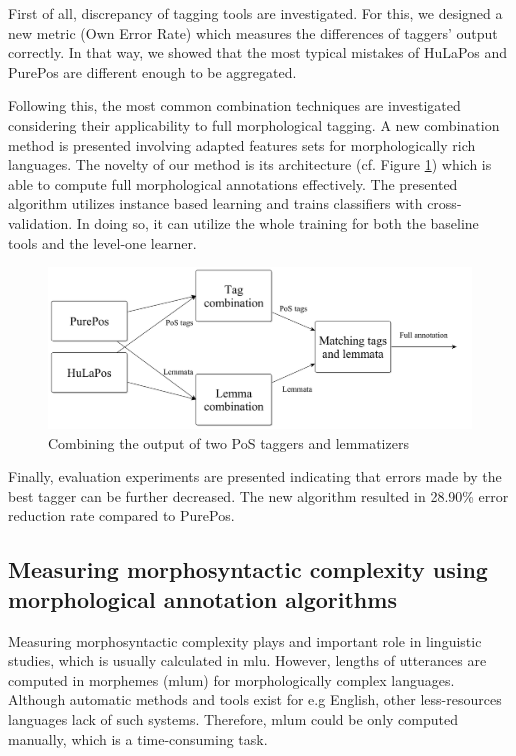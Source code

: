 First of all, discrepancy of tagging tools are investigated. 
For this, we designed a new metric (Own Error Rate) which measures the differences of taggers' output correctly.
In that way, we showed that the most typical mistakes of HuLaPos and PurePos are different enough to be aggregated.

Following this, the most common combination techniques are investigated considering their applicability to full morphological tagging.
A new combination method is presented involving adapted features sets for morphologically rich languages.
The novelty of our method is its architecture (cf. Figure \ref{fig:comb3_en}) which is able to compute full morphological annotations effectively.
The presented algorithm utilizes instance based learning \cite{Aha1991} and trains classifiers with cross-validation.
In doing so, it can utilize the whole training for both the baseline tools and the level-one learner.

\begin{figure}[H]
  \centering
  \includegraphics[scale=0.15]{MorphTagging/comb3.png} 
  \caption{Combining the output of two PoS taggers and lemmatizers}
  \label{fig:comb3_en}
\end{figure}


Finally, evaluation experiments are presented indicating that errors made by the best tagger can be further decreased.
The new algorithm resulted in 28.90\% error reduction rate compared to PurePos.

\subsection{Measuring morphosyntactic complexity using morphological annotation algorithms}
\label{thes:mlu}

Measuring morphosyntactic complexity plays and important role in linguistic studies, which is usually calculated in \acrlong{mlu}.
However, lengths of utterances are computed in morphemes (\acrshort{mlum}) for morphologically complex languages.
Although automatic methods and tools exist for e.g English, other less-resources languages lack of such systems.
Therefore, \acrshort{mlum} could be only computed manually, which is a time-consuming task.


